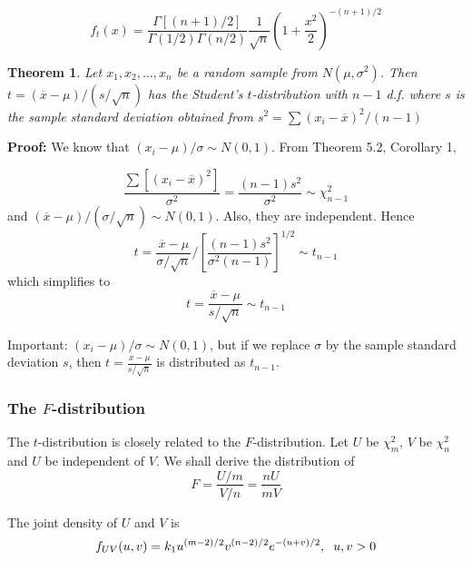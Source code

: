 \documentclass{article}
\newtheorem{theorem}{Theorem}[section]
\begin{document}
\begin{equation*}
    f_t(x)=\frac{\Gamma[(n+1)/2]}{\Gamma(1/2)\Gamma(n/2)} \frac{1}{\sqrt{n}} \left(1+\frac{x^2}{2}\right)^{-(n+1)/2}
\end{equation*}

\begin{theorem}
    Let \(x_1,x_2,\dots,x_n\) be a random sample from \(N(\mu,\sigma^2)\). Then \(t=(\overline{x}-\mu)/(s/\sqrt{n})\) has the Student's $t$-distribution with $n-1$ d.f. where $s$ is the sample standard deviation obtained from \(s^2=\sum(x_i-\overline{x})^2/(n-1)\)
\end{theorem}

\textbf{Proof:} We know that \((x_i-\mu)/\sigma \sim N(0,1)\). From Theorem 5.2, Corollary 1,

\begin{equation*}
    \frac{\sum[(x_i-\overline{x})^2]}{\sigma^2}= \frac{(n-1)s^2}{\sigma^2}\sim\chi_{n-1}^2
\end{equation*}
and \((\overline{x}-\mu)/(\sigma/\sqrt{n})\sim N(0,1)\). Also, they are independent. Hence
\begin{equation*}
    t=\frac{\overline{x}-\mu}{\sigma/\sqrt{n}} / \left[\frac{(n-1)s^2}{\sigma^2(n-1)}\right]^{1/2} \sim t_{n-1}
\end{equation*}
which simplifies to
\begin{equation*}
    t=\frac{\overline{x}-\mu}{s/\sqrt{n}}\sim t_{n-1}
\end{equation*}

Important: \((x_i-\mu)/\sigma \sim N(0,1)\), but if we replace $\sigma$ by the sample standard deviation $s$, then \(t=\frac{\overline{x}-\mu}{s/\sqrt{n}}\) is distributed as \(t_{n-1}\).

\subsubsection{The \(F\)-distribution}

The $t$-distribution is closely related to the $F$-distribution. Let $U$ be $\chi_m^2$, $V$ be $\chi_n^2$ and $U$ be independent of $V$. We shall derive the distribution of
\begin{equation*}
    F=\frac{U/m}{V/n}=\frac{nU}{mV}
\end{equation*}

The joint density of $U$ and $V$ is
\begin{equation*}
    f_{UV}(u,v)=k_1 u^{(m-2)/2}v^{(n-2)/2}e^{-(u+v)/2}, \hspace{0.2cm} u,v>0
 \end{equation*}
 
\end{document}
